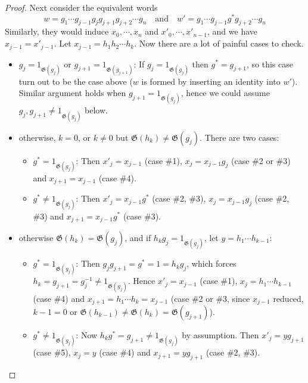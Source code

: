 \documentclass[a4paper]{article}
\theoremstyle{remark}
\theoremstyle{definition}
\theoremstyle{definition}
\theoremstyle{plain}
\newcommand{\gid}{\mathfrak{G}}
\begin{document}
\begin{proof}
    Next consider the equivalent words
    \[ w = g_1 \cdots g_{j-1} g_j g_{j+1} g_{j+2} \cdots g_n 
      \quad\text{and}\quad w' = g_1 \cdots g_{j-1} g^* g_{j+2} \cdots g_n \]
    Similarly, they would induce $x_0, \cdots, x_n$ and $x'_0, \cdots, x'_{n-1}$, and
    we have $x_{j-1} = x'_{j-1}$. Let $x_{j-1} = h_1 h_2 \cdots h_k$. 
    Now there are a lot of painful cases to check.
    \begin{itemize}
      \item $g_j = 1_{\gid(g_j)} \text{ or } g_{j+1} = 1_{\gid(g_{j+1})}$: 
        If $g_j = 1_{\gid(g_j)}$ then $g^* = g_{j+1}$, so this case turn out to be the case above ($w$
        is formed by inserting an identity into $w'$). Similar argument holds when $g_{j+1} = 1_{\gid(g_j)}$,
        hence we could assume $g_j, g_{j+1} \neq 1_{\gid(g_j)}$ below.
      \item otherwise, $k = 0$, or $k \neq 0$ but $\gid(h_k) \neq \gid(g_j)$. There are two cases:
        \begin{itemize}
          \item $g^* = 1_{\gid(g_j)}$: Then $x'_j = x_{j-1}$ (case \#1), $x_j = x_{j-1} g_j$ (case \#2 
            or \#3) and $x_{j+1} = x_{j-1}$ (case \#4).
          \item $g^* \neq 1_{\gid(g_j)}$: Then $x'_j = x_{j-1} g^*$ (case \#2, \#3),
            $x_j = x_{j-1} g_j$ (case \#2, \#3) and $x_{j+1} = x_{j-1} g^*$ (case \#3).
        \end{itemize}
      \item otherwise $\gid(h_k) = \gid(g_j)$, and if $h_k g_j = 1_{\gid(g_j)}$,
        let $y = h_1 \cdots h_{k-1}$:
        \begin{itemize}
          \item $g^* = 1_{\gid(g_j)}$: Then $g_j g_{j+1} = g^* = 1 = h_k g_j$, which forces
            $h_k = g_{j+1} = g^{-1}_j \neq 1_{\gid(g_j)}$.  
            Hence $x'_j = x_{j-1}$ (case \#1), $x_j = h_1 \cdots h_{k-1}$
            (case \#4) and $x_{j+1} = h_1 \cdots h_k = x_{j-1}$ (case \#2 or \#3, since $x_{j-1}$ reduced, 
            $k-1 = 0$ or $\gid(h_{k-1}) \neq \gid(h_k) = \gid(g_{j+1})$).
          \item $g^* \neq 1_{\gid(g_j)}$: 
            Now $h_k g^* = g_{j+1} \neq 1_{\gid(g_j)}$ by assumption. Then
              $x'_j = y g_{j+1}$ (case \#5), $x_j = y$ (case \#4) and $x_{j+1} = y g_{j+1}$ 
                (case \#2, \#3).
        \end{itemize}


\end{itemize}
\end{proof}
\end{document}
